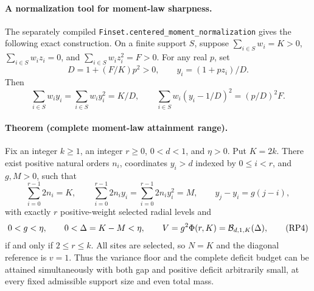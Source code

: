 \paragraph{A normalization tool for moment-law sharpness.}
The separately compiled \texttt{Finset.centered\_moment\_normalization}
gives the following exact construction. On a finite support \(S\), suppose
\(\sum_{i\in S}w_i=K>0\), \(\sum_{i\in S}w_i z_i=0\), and
\(\sum_{i\in S}w_i z_i^2=F>0\). For any real \(p\), set
\[
 D=1+(F/K)p^2>0,\qquad y_i=(1+pz_i)/D.
\]
Then
\[
 \sum_{i\in S}w_i y_i=\sum_{i\in S}w_i y_i^2=K/D,\qquad
 \sum_{i\in S}w_i(y_i-1/D)^2=(p/D)^2F.
\]
\paragraph{Theorem (complete moment-law attainment range).}
Fix an integer \(k\ge1\), an integer \(r\ge0\), \(0<d<1\), and
\(\eta>0\). Put \(K=2k\). There exist positive natural orders
\(n_i\), coordinates \(y_i>d\) indexed by \(0\le i<r\), and
\(g,M>0\), such that
\[
 \sum_{i=0}^{r-1}2n_i=K,\qquad
 \sum_{i=0}^{r-1}2n_i y_i
 =\sum_{i=0}^{r-1}2n_i y_i^2=M,\qquad
 y_j-y_i=g(j-i),
\]
with exactly \(r\) positive-weight selected radial levels and
\begin{equation}
 0<g<\eta,\qquad 0<\Delta=K-M<\eta,\qquad
 V=g^2\Phi(r,K)={\cal B}_{d,1,K}(\Delta),
 \tag{RP4}\label{eq:all-r-moment-attainment}
\end{equation}
if and only if \(2\le r\le k\).
All sites are selected, so \(N=K\) and the diagonal reference is \(v=1\).
Thus the variance floor and the complete deficit budget can be attained
simultaneously with both gap and positive deficit arbitrarily small,
at every fixed admissible support size and even total mass.

